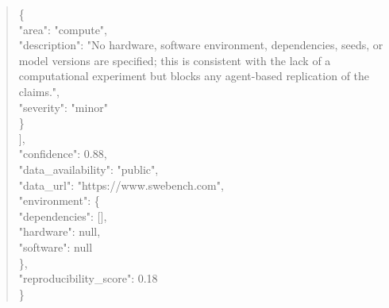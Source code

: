 \documentclass[11pt]{article}
\begin{document}
\begin{quote}
    \{\\
      "area": "compute",\\
      "description": "No hardware, software environment, dependencies, seeds, or model versions are specified; this is consistent with the lack of a computational experiment but blocks any agent-based replication of the claims.",\\
      "severity": "minor"\\
    \}\\
  ],\\
  "confidence": 0.88,\\
  "data\_availability": "public",\\
  "data\_url": "https://www.swebench.com",\\
  "environment": \{\\
    "dependencies": [],\\
    "hardware": null,\\
    "software": null\\
  \},\\
  "reproducibility\_score": 0.18\\
\}\\
\end{quote}
\end{document}
